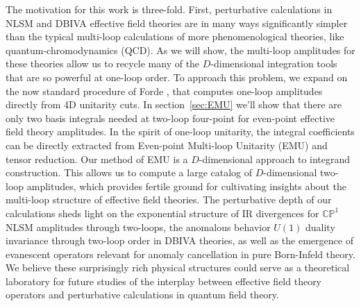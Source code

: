 \documentclass[11pt,letter]{article}
\def\sect#1{section~\ref{#1}}
\begin{document}
The motivation for this work is three-fold. First, perturbative calculations in NLSM and DBIVA effective field theories are in many ways significantly simpler than the typical multi-loop calculations of more phenomenological theories, like quantum-chromodynamics (QCD). As we will show, the multi-loop amplitudes for these theories allow us to recycle many of the $D$-dimensional integration tools that are so powerful at one-loop order. To approach this problem, we expand on the now standard procedure of Forde \cite{Forde:2007mi}, that computes one-loop amplitudes directly from 4D unitarity cuts. In \sect{sec:EMU} we'll show that there are only two basis integrals needed at two-loop four-point for even-point effective field theory amplitudes. In the spirit of one-loop unitarity, the integral coefficients can be directly extracted from Even-point Multi-loop Unitarity (EMU) and tensor reduction. Our method of EMU is a $D$-dimensional approach to integrand construction. This allows us to compute a large catalog of $D$-dimensional two-loop amplitudes, which provides fertile ground for cultivating insights about the multi-loop structure of effective field theories. The perturbative depth of our calculations sheds light on the exponential structure of IR divergences for $\mathbb{CP}^1$ NLSM amplitudes through two-loops, the anomalous behavior $U(1)$ duality invariance through two-loop order in DBIVA theories, as well as the emergence of evanescent operators relevant for anomaly cancellation in pure Born-Infeld theory. We believe these surprisingly rich physical structures could serve as a theoretical laboratory for future studies of the interplay between effective field theory operators and perturbative calculations in quantum field theory. 
\end{document}
